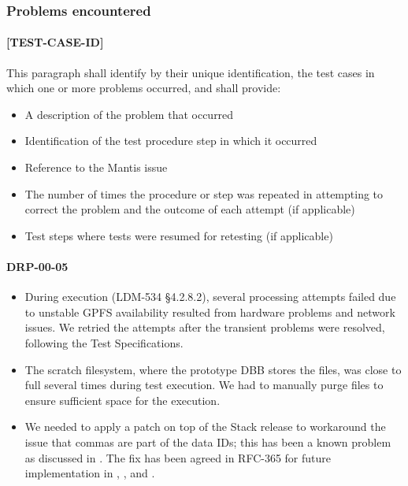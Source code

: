 \documentclass[DM,lsstdraft,STR,toc]{lsstdoc}
\begin{document}
\subsubsection{Problems encountered}
\paragraph{[TEST-CASE-ID]}
This paragraph shall identify by their unique identification, the test cases in which one or more problems occurred, and shall provide:
\begin{itemize}
\item A description of the problem that occurred
\item Identification of the test procedure step in which it occurred
\item Reference to the Mantis issue
\item The number of times the procedure or step was repeated in attempting to correct the problem and the outcome of each attempt (if applicable)
\item Test steps where tests were resumed for retesting (if applicable)
\end{itemize}

\paragraph{DRP-00-05}

\begin{itemize}

  \item{
    During execution (LDM-534 \S 4.2.8.2), several processing attempts failed due to unstable GPFS availability resulted from hardware problems and network issues.
    We retried the attempts after the transient problems were resolved, following the Test Specifications.
  }

  \item{
    The scratch filesystem, where the prototype DBB stores the files, was close to full several times during test execution.
	We had to manually purge files to ensure sufficient space for the execution.
  }

  \item{
    We needed to apply a patch on top of the Stack release to workaround the issue that commas are part of the data IDs; this has been a known problem as discussed in .
	The fix has been agreed in RFC-365 for future implementation in , , and .
  }

\end{itemize}
\end{document}
